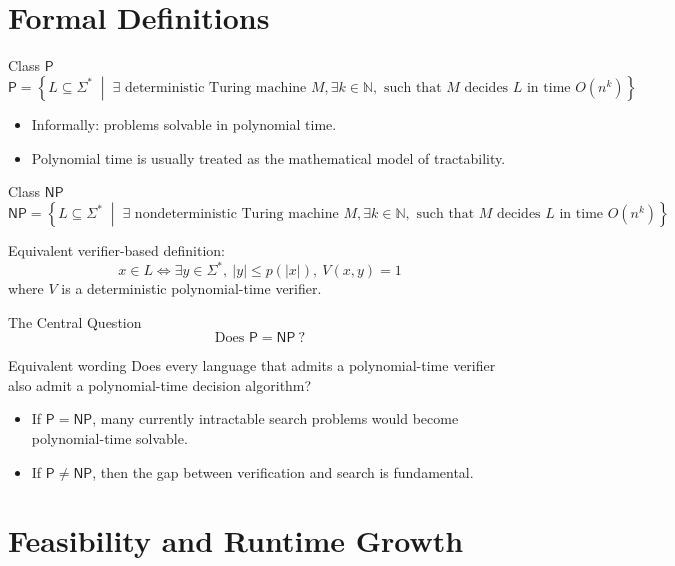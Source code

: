 \documentclass[aspectratio=43]{beamer}
\begin{document}
\section{Formal Definitions}

\begin{frame}{Class $\mathsf{P}$}
\[
\mathsf{P}
=
\left\{
L \subseteq \Sigma^*
\;\middle|\;
\exists \text{ deterministic Turing machine } M,
\exists k \in \mathbb{N},
\text{ such that } M \text{ decides } L
\text{ in time } O(n^k)
\right\}
\]

\begin{itemize}
    \item Informally: problems solvable in polynomial time.
    \item Polynomial time is usually treated as the mathematical model of tractability.
\end{itemize}
\end{frame}

\begin{frame}{Class $\mathsf{NP}$}
\[
\mathsf{NP}
=
\left\{
L \subseteq \Sigma^*
\;\middle|\;
\exists \text{ nondeterministic Turing machine } M,
\exists k \in \mathbb{N},
\text{ such that } M \text{ decides } L
\text{ in time } O(n^k)
\right\}
\]

\medskip
Equivalent verifier-based definition:
\[
x \in L \iff \exists y \in \Sigma^*,\ |y| \le p(|x|),\ V(x,y)=1
\]
where $V$ is a deterministic polynomial-time verifier.
\end{frame}

\begin{frame}{The Central Question}
\[
\text{Does } \mathsf{P} = \mathsf{NP}\ ?
\]

\medskip
\begin{block}{Equivalent wording}
Does every language that admits a polynomial-time verifier also admit a polynomial-time decision algorithm?
\end{block}

\begin{itemize}
    \item If \(\mathsf{P}=\mathsf{NP}\), many currently intractable search problems would become polynomial-time solvable.
    \item If \(\mathsf{P}\neq\mathsf{NP}\), then the gap between verification and search is fundamental.
\end{itemize}
\end{frame}

\section{Feasibility and Runtime Growth}
\end{document}
